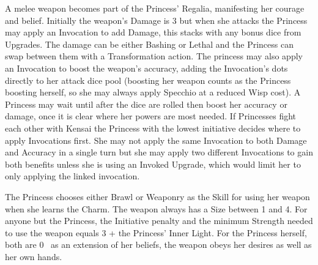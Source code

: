 \noindent A melee weapon becomes part of the Princess’ Regalia, manifesting her courage and belief. Initially the weapon's Damage is 3 but when she attacks the Princess may apply an Invocation to add Damage, this stacks with any bonus dice from Upgrades. The damage can be either Bashing or Lethal and the Princess can swap between them with a Transformation action. The princess may also apply an Invocation to boost the weapon's accuracy, adding the Invocation's dots directly to her attack dice pool (boosting her weapon counts as the Princess boosting herself, so she may always apply Specchio at a reduced Wisp cost). A Princess may wait until after the dice are rolled then boost her accuracy or damage, once it is clear where her powers are most needed. If Princesses fight each other with Kensai the Princess with the lowest initiative decides where to apply Invocations first. She may not apply the same Invocation to both Damage and Accuracy in a single turn but she may apply two different Invocations to gain both benefits unless she is using an Invoked Upgrade, which would limit her to only applying the linked invocation. 

The Princess chooses either Brawl or Weaponry as the Skill for using her weapon when she learns the Charm. The weapon always has a Size between 1 and 4. For anyone but the Princess, the Initiative penalty and the minimum Strength needed to use the weapon equals 3 + the Princess' Inner Light. For the Princess herself, both are 0 \textendash\, as an extension of her beliefs, the weapon obeys her desires as well as her own hands.

